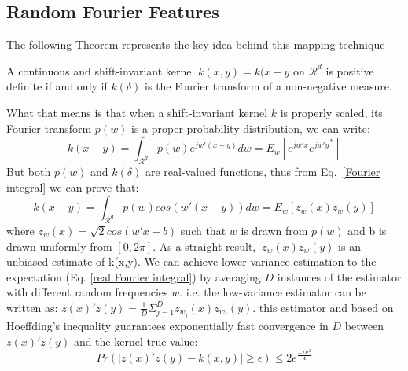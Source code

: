 \subsection{Random Fourier Features}
The following Theorem represents the key idea behind this mapping technique
\begin{theorem}
A continuous and shift-invariant kernel $k(x,y)=k(x-y$ on $\mathcal{R}^d$ is positive definite if and only if $k(\delta)$ is the Fourier transform of a non-negative measure.
\end{theorem}
What that means is that when a shift-invariant kernel $k$ is properly scaled, its Fourier transform $p(w)$ is a proper probability distribution, we can write:
\begin{equation}
\label{Fourier integral}
k(x-y)=\int_{\mathcal{R}^d}p(w)e^{j{w}'(x-y)}dw=E_w[e^{j{w}'x}{e^{j{w}'y}}^*]
\end{equation}
But both $p(w)$ and $k(\delta)$ are real-valued functions, thus from Eq.~\ref{Fourier integral} we can prove that:
\begin{equation}
\label{real Fourier integral}
k(x-y)=\int_{\mathcal{R}^d}p(w)cos({{w}'(x-y)})dw=E_w[z_w(x)z_w(y)]
\end{equation}
where $z_w(x)=\sqrt{2}cos({w}'x+b)$ such that $w$ is drawn from $p(w)$ and b is drawn uniformly from $[0,2\pi]$.\newline
As a straight result, $\ z_w(x)z_w(y)$ is an unbiased estimate of k(x,y). We can achieve lower variance estimation to the expectation (Eq. \ref{real Fourier integral}) by averaging $D$ instances of the estimator with different random frequencies $w$. i.e. the low-variance estimator can be written as: $z(x)'z(y)=\frac{1}{D} \Sigma_{j=1}^D z_{w_j}(x)z_{w_j}(y)$. this estimator and based on Hoeffding's inequality guarantees exponentially fast convergence in $D$ between $z(x)'z(y)$ and the kernel true value:
\begin{equation}
    Pr(|z(x)'z(y)-k(x,y)|\geq\epsilon)\leq2e^\frac{-D\epsilon^2}{4}
\end{equation}


